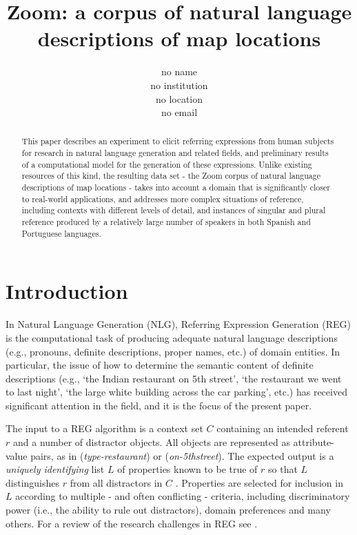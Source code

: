 \documentclass{article}
\title{Zoom: a corpus of natural language descriptions of map locations}
\author{no name \\
no institution\\
no location \\
no email}
\begin{document}
\raggedbottom

\maketitle

\begin{abstract}
This paper describes 
an experiment  to elicit referring expressions
from human subjects 
for research in natural language generation and related fields,
and preliminary results of a computational model 
for the generation of these expressions.
Unlike existing resources of this kind, 
the resulting data set - the Zoom corpus of natural language descriptions of map locations -
takes into account a domain that is significantly closer to real-world applications, 
and addresses more complex situations of reference, including
contexts with different levels of detail, and
instances of singular and plural reference 
produced by a relatively large number of speakers 
in both Spanish and Portuguese languages.
\end{abstract}


\section{Introduction}

In Natural Language Generation (NLG), Referring Expression Generation (REG) is the computational task of producing adequate natural language descriptions (e.g., pronouns, definite descriptions, proper names, etc.) of domain entities. In particular, the issue of how to determine the semantic content of definite descriptions (e.g., `the Indian restaurant on 5th street', `the restaurant we went to last night', `the large white building across the car parking', etc.) has received significant attention in the field, and it is the focus of the present paper.

The input to a REG algorithm is a context set $C$ containing an intended referent $r$ and a number of distractor objects. All objects are represented as attribute-value pairs, as in ({\em type-restaurant}) or ({\em on-5thstreet}). The expected output is a {\em uniquely identifying} list $L$ of properties known to be true of $r$ so that $L$ distinguishes $r$ from all distractors in $C$ \cite{incremental}. Properties are selected for inclusion in $L$ according to multiple - and often conflicting - criteria, including discriminatory power (i.e., the ability to rule out distractors), domain preferences and many others. For a review of the research challenges in REG see \cite{survey}.
\end{document}

